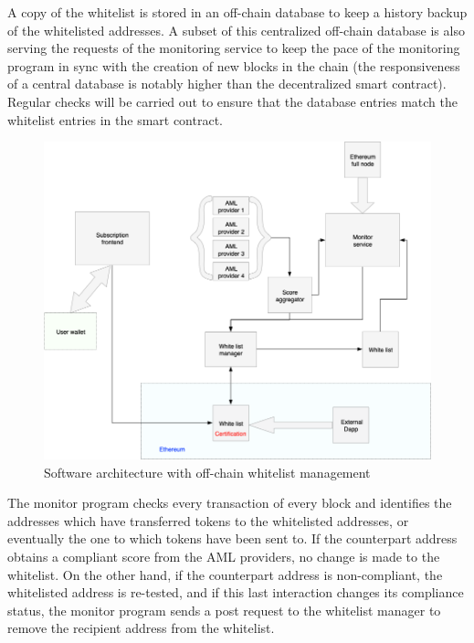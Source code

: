 ﻿\documentclass[a4paper]{article}
\begin{document}
A copy of the whitelist is stored in an off-chain database to keep a history backup of the whitelisted addresses. A subset of this centralized off-chain database is also serving the requests of the monitoring service to keep the pace of the monitoring program in sync with the creation of new blocks in the chain (the responsiveness of a central database is notably higher than the decentralized smart contract). Regular checks will be carried out to ensure that the database entries match the whitelist entries in the smart contract. \\  

\begin{figure}[!h]
\centering
\includegraphics[scale=0.35]{architecture_v1_trim.png}
\caption{Software architecture with off-chain whitelist management}
\label{offchain}
\end{figure}


The monitor program checks every transaction of every block and identifies the addresses which have transferred tokens to the whitelisted addresses, or eventually the one to which tokens have been sent to. If the counterpart address obtains a compliant score from the AML providers, no change is made to the whitelist. On the other hand, if the counterpart address is non-compliant, the whitelisted address is re-tested, and if this last interaction changes its compliance status, the monitor program sends a post request to the whitelist manager to remove the recipient address from the whitelist. \\
\end{document}
